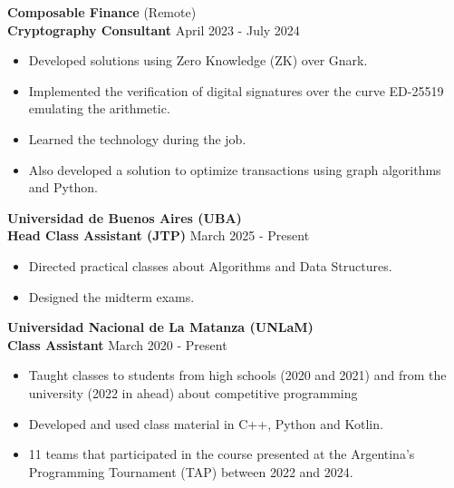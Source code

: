 \documentclass[10pt]{article}
\begin{document}
\vspace{8pt}

\textbf{Composable Finance} \hfill (Remote)\\
\textbf{Cryptography Consultant} \hfill April 2023 - July 2024
\begin{itemize}[noitemsep, topsep=0pt, partopsep=0pt, parsep=0pt]
    \item Developed solutions using Zero Knowledge (ZK) over Gnark.
    \item Implemented the verification of digital signatures over the curve ED-25519 emulating the arithmetic.
    \item Learned the technology during the job.
    \item Also developed a solution to optimize transactions using graph algorithms and Python.
\end{itemize}

\vspace{8pt}

\textbf{Universidad de Buenos Aires (UBA)}\\
\textbf{Head Class Assistant (JTP)} \hfill March 2025 - Present
\begin{itemize}[noitemsep, topsep=0pt, partopsep=0pt, parsep=0pt]
    \item Directed practical classes about Algorithms and Data Structures.
    \item Designed the midterm exams.
\end{itemize}

\vspace{8pt}

\textbf{Universidad Nacional de La Matanza (UNLaM)}\\
\textbf{Class Assistant} \hfill March 2020 - Present
\begin{itemize}[noitemsep, topsep=0pt, partopsep=0pt, parsep=0pt]
    \item Taught classes to students from high schools (2020 and 2021) and from the university (2022 in ahead) about competitive programming
    \item Developed and used class material in C++, Python and Kotlin.
    \item 11 teams that participated in the course presented at the Argentina's Programming Tournament (TAP) between 2022 and 2024.
\end{itemize}

\vspace{8pt}
\end{document}
